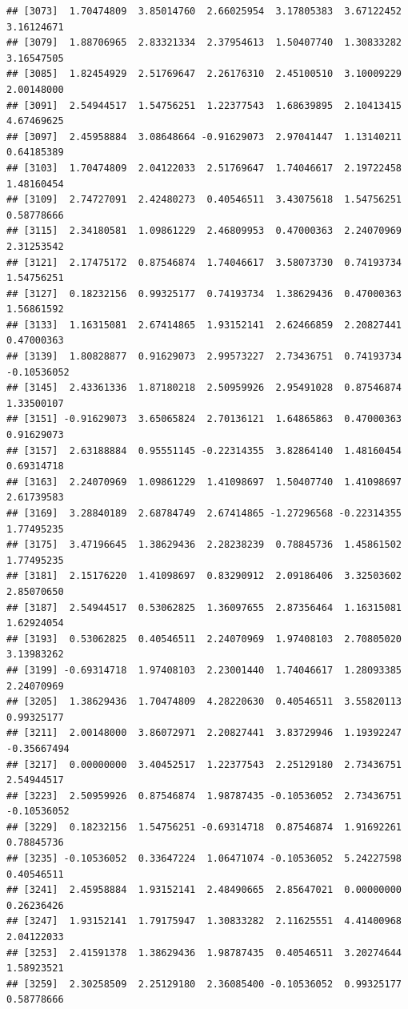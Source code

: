 \documentclass[
]{article}
\begin{document}
\begin{verbatim}
## [3073]  1.70474809  3.85014760  2.66025954  3.17805383  3.67122452  3.16124671
## [3079]  1.88706965  2.83321334  2.37954613  1.50407740  1.30833282  3.16547505
## [3085]  1.82454929  2.51769647  2.26176310  2.45100510  3.10009229  2.00148000
## [3091]  2.54944517  1.54756251  1.22377543  1.68639895  2.10413415  4.67469625
## [3097]  2.45958884  3.08648664 -0.91629073  2.97041447  1.13140211  0.64185389
## [3103]  1.70474809  2.04122033  2.51769647  1.74046617  2.19722458  1.48160454
## [3109]  2.74727091  2.42480273  0.40546511  3.43075618  1.54756251  0.58778666
## [3115]  2.34180581  1.09861229  2.46809953  0.47000363  2.24070969  2.31253542
## [3121]  2.17475172  0.87546874  1.74046617  3.58073730  0.74193734  1.54756251
## [3127]  0.18232156  0.99325177  0.74193734  1.38629436  0.47000363  1.56861592
## [3133]  1.16315081  2.67414865  1.93152141  2.62466859  2.20827441  0.47000363
## [3139]  1.80828877  0.91629073  2.99573227  2.73436751  0.74193734 -0.10536052
## [3145]  2.43361336  1.87180218  2.50959926  2.95491028  0.87546874  1.33500107
## [3151] -0.91629073  3.65065824  2.70136121  1.64865863  0.47000363  0.91629073
## [3157]  2.63188884  0.95551145 -0.22314355  3.82864140  1.48160454  0.69314718
## [3163]  2.24070969  1.09861229  1.41098697  1.50407740  1.41098697  2.61739583
## [3169]  3.28840189  2.68784749  2.67414865 -1.27296568 -0.22314355  1.77495235
## [3175]  3.47196645  1.38629436  2.28238239  0.78845736  1.45861502  1.77495235
## [3181]  2.15176220  1.41098697  0.83290912  2.09186406  3.32503602  2.85070650
## [3187]  2.54944517  0.53062825  1.36097655  2.87356464  1.16315081  1.62924054
## [3193]  0.53062825  0.40546511  2.24070969  1.97408103  2.70805020  3.13983262
## [3199] -0.69314718  1.97408103  2.23001440  1.74046617  1.28093385  2.24070969
## [3205]  1.38629436  1.70474809  4.28220630  0.40546511  3.55820113  0.99325177
## [3211]  2.00148000  3.86072971  2.20827441  3.83729946  1.19392247 -0.35667494
## [3217]  0.00000000  3.40452517  1.22377543  2.25129180  2.73436751  2.54944517
## [3223]  2.50959926  0.87546874  1.98787435 -0.10536052  2.73436751 -0.10536052
## [3229]  0.18232156  1.54756251 -0.69314718  0.87546874  1.91692261  0.78845736
## [3235] -0.10536052  0.33647224  1.06471074 -0.10536052  5.24227598  0.40546511
## [3241]  2.45958884  1.93152141  2.48490665  2.85647021  0.00000000  0.26236426
## [3247]  1.93152141  1.79175947  1.30833282  2.11625551  4.41400968  2.04122033
## [3253]  2.41591378  1.38629436  1.98787435  0.40546511  3.20274644  1.58923521
## [3259]  2.30258509  2.25129180  2.36085400 -0.10536052  0.99325177  0.58778666

\end{verbatim}
\end{document}
